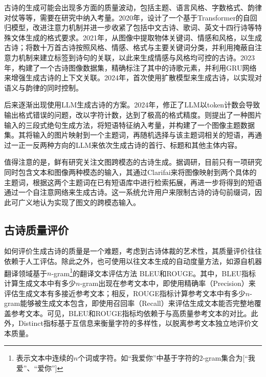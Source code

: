 古诗的生成可能会出现多方面的质量波动，包括主题、语言风格、字数格式、韵律对仗等等，需要在研究中纳入考量。2020年，\cite{liRigidFormatsControlled2020}设计了一个基于Transformer的自回归模型，改进注意力机制并进一步收紧了包括中文古诗、歌词、英文十四行诗等特殊文体生成的格式要求。2021年，\cite{wuGenerateClassicalChinese2021}从图像中提取物体关键词、情感和风格，以生成古诗；\cite{shaoSentimentStyleControllable2021}将数十万首古诗按照风格、情感、格式与主要关键词分类，并利用掩蔽自注意力机制来建立标签到诗句的关联，以此来生成情感与风格均可控的古诗。2023年，\cite{renGeneratingChinesePoetry2023}构建了一个古诗图像数据集，精确标注了其中的诗歌元素，并利用GRU网络来增强生成古诗的上下文关联。2024年，\cite{huPoetryDiffusionJointSemantic2024}首次使用扩散模型来生成古诗，以实现对语义与韵律的同时控制。

后来逐渐出现使用LLM生成古诗的方案。2024年，\cite{yuCharPoetChineseClassical2024}修正了LLM以token计数会导致输出格式错误的问题，改以字符计数，达到了极高的格式精度。\cite{liuMultiModalChinesePoetry2018}则提出了一种图片输入的三段式绝句生成方法，将短语特征纳入考量，并构建了一个图像主题数据集。其将输入的图片映射到一个主题词，再随机选择与该主题词相关的短语，再通过一正一反两种方向的LLM来依次生成古诗的首行、标题和其他主体内容。

值得注意的是，鲜有研究关注文图跨模态的古诗生成。据调研，目前只有\cite{liuDeepPoetryChinese2020}一项研究同时包含文本和图像两种模态的输入，其通过Clarifai来将图像映射到两个具体的主题词，根据这两个主题词在已有短语库中进行检索拓展，再进一步将得到的短语通过一个自注意网络来生成古诗。这一系统允许用户来限制古诗的诗句前缀词，因此可广义地认为实现了图文的跨模态输入。

\subsection{古诗质量评价}
如何评价生成古诗的质量是一个难题，考虑到古诗体裁的艺术性，其质量评价往往依赖于人工评估。除此之外，也可使用以往文本生成的自动度量方法，如源自机器翻译领域基于$n$-gram\footnote{表示文本中连续的$n$个词或字符。如“我爱你”中基于字符的$2$-gram集合为[“我爱”、“爱你”]}的翻译文本评估方法
BLEU\cite{papineniBLEUMethodAutomatic2002}和ROUGE\cite{linROUGEPackageAutomatic2004}。其中，BLEU指标计算生成文本中有多少$n$-gram出现在参考文本中，即使用精确率（Precision）来评估生成文本有多接近参考文本；相反，ROUGE指标计算参考文本中有多少$n$-gram能够被生成文本包含，即使用召回率（Recall）来评估生成文本能否完整地覆盖参考文本。可见，BLEU和ROUGE指标均依赖于与高质量参考文本的对比。此外，Distinct指标基于互信息来衡量字符的多样性，以脱离参考文本独立地评价文本质量。\cite{liDiversityPromotingObjectiveFunction2016}

